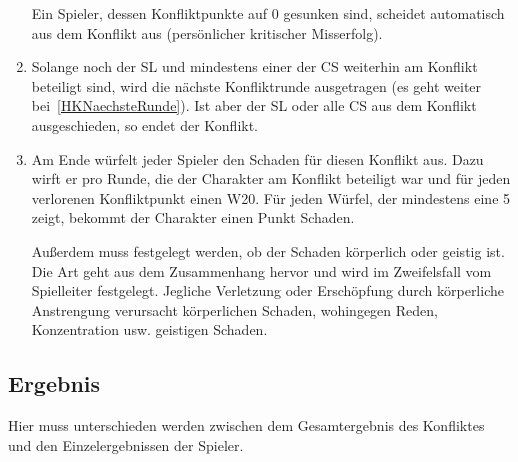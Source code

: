 \begin{enumerate}
  Ein Spieler, dessen Konfliktpunkte auf 0 gesunken sind, scheidet automatisch aus dem Konflikt aus (persönlicher kritischer Misserfolg).

  \item Solange noch der SL und mindestens einer der CS weiterhin am Konflikt beteiligt sind, wird die nächste Konfliktrunde ausgetragen (es geht weiter bei~\ref{HKNaechsteRunde}). Ist aber der SL oder alle CS aus dem Konflikt ausgeschieden, so endet der Konflikt.

  \item Am Ende würfelt jeder Spieler den Schaden für diesen Konflikt aus. Dazu wirft er pro Runde, die der Charakter am Konflikt beteiligt war und für jeden verlorenen Konfliktpunkt einen W20. Für jeden Würfel, der mindestens eine 5 zeigt, bekommt der Charakter einen Punkt Schaden. 

  Außerdem muss festgelegt werden, ob der Schaden körperlich oder geistig ist. Die Art geht aus dem Zusammenhang hervor und wird im Zweifelsfall vom Spielleiter festgelegt. Jegliche Verletzung oder Erschöpfung durch körperliche Anstrengung verursacht körperlichen Schaden, wohingegen Reden, Konzentration usw. geistigen Schaden. 

\end{enumerate}

\subsection{Ergebnis}
Hier muss unterschieden werden zwischen dem Gesamtergebnis des Konfliktes und den Einzelergebnissen der Spieler.

